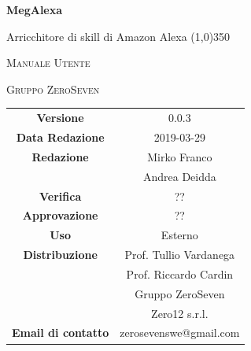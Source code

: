 \documentclass[a4paper,12pt,openany]{book}
\author{Ludovico Brocca}
\date{2018-12-19}
\begin{document}
\begin{titlepage}
	\centering
	{\huge\bfseries MegAlexa \par}
	Arricchitore di skill di Amazon Alexa
	\line(1,0){350} \\
	{\scshape\LARGE Manuale Utente \par}
	\vspace{1cm}
	{\scshape Gruppo ZeroSeven \par}
	\logo
	\begin{tabular}{c|c}
		{\hfill \textbf{Versione}} 			& 0.0.3	\\
		{\hfill\textbf{Data Redazione}} 	& 2019-03-29	\\ 
		{\hfill\textbf{Redazione}} 		& Mirko Franco \\ & Andrea Deidda \\
		{\hfill\textbf{Verifica}} 				&  	?? \\
		{\hfill\textbf{Approvazione}} 		&  	?? \\
		{\hfill\textbf{Uso}} 					& 		Esterno		\\ 
		{\hfill\textbf{Distribuzione}} 			& 			Prof. Tullio Vardanega \\ & Prof. Riccardo Cardin \\ & Gruppo ZeroSeven	\\ & Zero12 s.r.l. \\
		{\hfill\textbf{Email di contatto}} & zerosevenswe@gmail.com \\
	\end{tabular}
\end{titlepage}
	
	\label{LastFrontPage}
	\newpage	
	
	\pagestyle{mymain}
	\tableofcontents
	\listoffigures
	\listoftables
	
	
	
	\label{LastPage}
\end{document}
